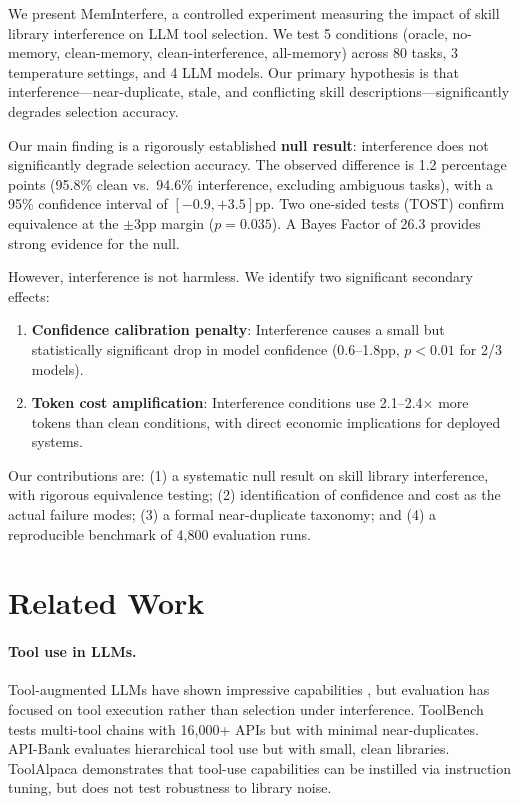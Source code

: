 \documentclass[11pt]{article}
\begin{document}
We present MemInterfere, a controlled experiment measuring the impact of skill library interference on LLM tool selection. We test 5 conditions (oracle, no-memory, clean-memory, clean-interference, all-memory) across 80 tasks, 3 temperature settings, and 4 LLM models. Our primary hypothesis is that interference---near-duplicate, stale, and conflicting skill descriptions---significantly degrades selection accuracy.

Our main finding is a rigorously established \textbf{null result}: interference does not significantly degrade selection accuracy. The observed difference is 1.2 percentage points (95.8\% clean vs.\ 94.6\% interference, excluding ambiguous tasks), with a 95\% confidence interval of $[-0.9, +3.5]$pp. Two one-sided tests (TOST) confirm equivalence at the $\pm$3pp margin ($p = 0.035$). A Bayes Factor of 26.3 provides strong evidence for the null.

However, interference is not harmless. We identify two significant secondary effects:
\begin{enumerate}
    \item \textbf{Confidence calibration penalty}: Interference causes a small but statistically significant drop in model confidence (0.6--1.8pp, $p < 0.01$ for 2/3 models).
    \item \textbf{Token cost amplification}: Interference conditions use 2.1--2.4$\times$ more tokens than clean conditions, with direct economic implications for deployed systems.
\end{enumerate}

Our contributions are: (1) a systematic null result on skill library interference, with rigorous equivalence testing; (2) identification of confidence and cost as the actual failure modes; (3) a formal near-duplicate taxonomy; and (4) a reproducible benchmark of 4,800 evaluation runs.


\section{Related Work}

\paragraph{Tool use in LLMs.}
Tool-augmented LLMs have shown impressive capabilities \citep{schick2023toolformer, patil2023gorilla, qin2023toolllm}, but evaluation has focused on tool execution rather than selection under interference. ToolBench \citep{qin2023toolllm} tests multi-tool chains with 16,000+ APIs but with minimal near-duplicates. API-Bank \citep{li2023api} evaluates hierarchical tool use but with small, clean libraries. ToolAlpaca \citep{tang2023toolalpaca} demonstrates that tool-use capabilities can be instilled via instruction tuning, but does not test robustness to library noise.
\end{document}

